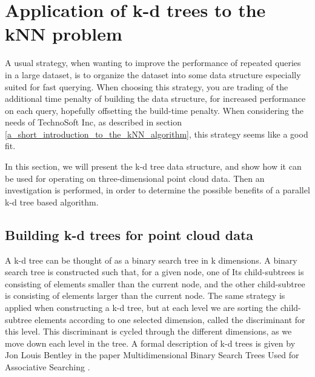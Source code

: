

\section{Application of k-d trees to the kNN problem} %
\label{sub:application_of_kd_trees_to_the_knn_problem}

A usual strategy, when wanting to improve the performance of repeated queries in a large dataset, is to organize the dataset into some data structure especially suited for fast querying. When choosing this strategy, you are trading of the additional time penalty of building the data structure, for increased performance on each query, hopefully offsetting the build-time penalty. When considering the needs of TechnoSoft Inc, as described in section \ref{a_short_introduction_to_the_kNN_algorithm}, this strategy seems like a good fit.

In this section, we will present the k-d tree data structure, and show how it can be used for operating on three-dimensional point cloud data. Then an investigation is performed, in order to determine the possible benefits of a parallel k-d tree based algorithm.


\subsection{Building k-d trees for point cloud data} %
\label{ssub:building_k_d_trees_for_point_cloud_data}

A k-d tree can be thought of as a binary search tree in k dimensions. A binary search tree is constructed such that, for a given node, one of Its child-subtrees is consisting of elements smaller than the current node, and the other child-subtree is consisting of elements larger than the current node. The same strategy is applied when constructing a k-d tree, but at each level we are sorting the child-subtree elements according to one selected dimension, called the discriminant for this level. This discriminant is cycled through the different dimensions, as we move down each level in the tree. A formal description of k-d trees is given by Jon Louis Bentley in the paper Multidimensional Binary Search Trees Used for Associative Searching \cite{Bentley:1975:MBS:361002.361007}.

